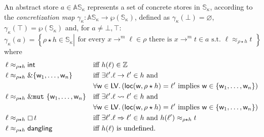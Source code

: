 \begin{definition}\label{def:concretization}
  An abstract store $a\in\mathbb{AS}_\kappa$ represents a set of concrete stores
  in $\mathbb{S}_\kappa$, according to the \emph{concretization map}
  $\gamma_\kappa:\mathbb{AS}_\kappa\to\wp(\mathbb{S}_\kappa)$, defined as
  $\gamma_\kappa(\bot)=\varnothing$, $\gamma_\kappa(\top)=\wp(\mathbb{S}_\kappa)$ and,
  for $a\not=\bot,\top$:
  \[
  \gamma_\kappa(a)=\left\{\rho\star h\in\mathbb{S}_\kappa\left|\begin{array}{l}
  \text{for every }x\to^m\ell\in\rho\text{ there is }x\to^m t\in a\text{ s.t.\ }\ell\approx_{\rho\star h}t
  \end{array}
  \right.\right\}
  \]
  where
  \begin{align*}
    \ell&\approx_{\rho\star h}\mathsf{int} && \text{iff $h(\ell)\in\mathbb{Z}$}\\
    \ell&\approx_{\rho\star h}\&\{\mathsf{w}_1,\ldots,\mathsf{w}_n\} && \text{iff $\exists\ell'.\ell\to\ell'\in h$ and}\\
    &&& \forall\mathsf{w}\in\mathsf{LV}.\left(\mathsf{loc}(\mathsf{w},\rho\star h)=\ell'\text{ implies }\mathsf{w}\in\{\mathsf{w}_1,\ldots,\mathsf{w}_n\}\right)\\
    \ell&\approx_{\rho\star h}\&\mathtt{mut}\ \{\mathsf{w}_1,\ldots,\mathsf{w}_n\} && \text{iff $\exists\ell'.\ell\leadsto\ell'\in h$ and}\\
    &&& \forall\mathsf{w}\in\mathsf{LV}.\left(\mathsf{loc}(\mathsf{w},\rho\star h)=\ell'\text{ implies }\mathsf{w}\in\{\mathsf{w}_1,\ldots,\mathsf{w}_n\}\right)\\
    \ell&\approx_{\rho\star h}\boxempty\,{t} && \text{iff $\exists\ell'.\ell\Rightarrow\ell'\in h$ and $h(\ell')\approx_{\rho\star h}t$}\\
    \ell&\approx_{\rho\star h}\mathsf{dangling} && \text{iff $h(\ell)$ is undefined.}
  \end{align*}
\end{definition}


